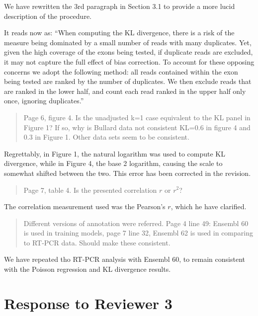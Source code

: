 \documentclass{article}
\begin{document}
We have rewritten the 3rd paragraph in Section 3.1 to provide a more lucid
description of the procedure.

It reads now as:
``When computing the KL divergence, there is a risk of the measure being dominated
by a small number of reads with many duplicates. Yet, given the high coverage of
the exons being tested, if duplicate reads are excluded, it may not capture the
full effect of bias correction. To account for these opposing concerns we adopt
the following method: all reads contained within the exon being tested are
ranked by the number of duplicates. We then exclude reads that are ranked in the
lower half, and count each read ranked in the upper half only once, ignoring
duplicates.''


\begin{quote}
Page 6, figure 4. Is the unadjusted k=1 case equivalent to the KL panel in
Figure 1? If so, why is Bullard data not consistent KL=0.6 in figure 4 and 0.3
in Figure 1. Other data sets seem to be consistent.
\end{quote}

Regrettably, in Figure 1, the natural logarithm was used to compute KL
divergence, while in Figure 4, the base 2 logarithm, causing the scale to
somewhat shifted between the two. This error has been corrected in the revision.


\begin{quote}
Page 7, table 4. Is the presented correlation $r$ or $r^2$?
\end{quote}

The correlation measurement used was the Pearson's $r$, which he have clarified.


\begin{quote}
Different versions of annotation were referred. Page 4 line 49: Ensembl 60 is
used in training models, page 7 line 32, Ensembl 62 is used in comparing to
RT-PCR data. Should make these consistent.
\end{quote}

We have repeated tho RT-PCR analysis with Ensembl 60, to remain consistent with
the Poisson regression and KL divergence results.


\section*{Response to Reviewer 3}
\end{document}
